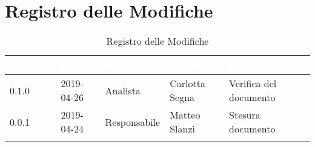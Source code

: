 \newpage

\section*{Registro delle Modifiche}

\begin{center}
\begin{longtable}[c]{|m{}|m{}|m{}|m{}|p{}|}
\hline
\rowcolor{bluelogo}\textbf{\textcolor{white}{Versione}} & \textbf{\textcolor{white}{Data}} & \textbf{\textcolor{white}{Ruolo}} & \textbf{\textcolor{white}{Autore}} & \textbf{\textcolor{white}{Descrizione}}\\
\hline \hline
\endfirsthead
\rowcolor{grigio} 0.1.0 & 2019-04-26 & Analista & Carlotta Segna & Verifica del documento \\
\hline
0.0.1 & 2019-04-24 & Responsabile & Matteo Slanzi & Stesura documento \\
\hline
\caption{Registro delle Modifiche}
\end{longtable}
\end{center}
